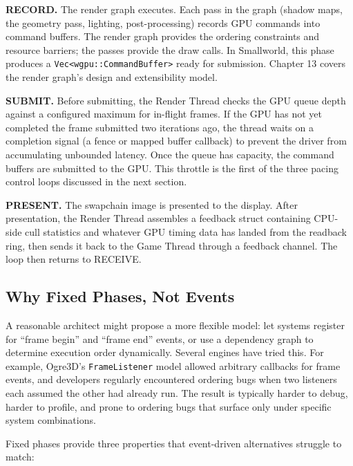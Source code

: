 \documentclass[
  11pt,
  letterpaper,
  DIV=11,
  numbers=noendperiod,
  twoside,
  open=right]{scrreprt}
\begin{document}
\textbf{RECORD.} The render graph executes. Each pass in the graph
(shadow maps, the geometry pass, lighting, post-processing) records GPU
commands into command buffers. The render graph provides the ordering
constraints and resource barriers; the passes provide the draw calls. In
Smallworld, this phase produces a
\texttt{Vec\textless{}wgpu::CommandBuffer\textgreater{}} ready for
submission. Chapter 13 covers the render graph's design and
extensibility model.

\textbf{SUBMIT.} Before submitting, the Render Thread checks the GPU
queue depth against a configured maximum for in-flight frames. If the
GPU has not yet completed the frame submitted two iterations ago, the
thread waits on a completion signal (a fence or mapped buffer callback)
to prevent the driver from accumulating unbounded latency. Once the
queue has capacity, the command buffers are submitted to the GPU. This
throttle is the first of the three pacing control loops discussed in the
next section.

\textbf{PRESENT.} The swapchain image is presented to the display. After
presentation, the Render Thread assembles a feedback struct containing
CPU-side cull statistics and whatever GPU timing data has landed from
the readback ring, then sends it back to the Game Thread through a
feedback channel. The loop then returns to RECEIVE.

\subsection{Why Fixed Phases, Not
Events}\label{why-fixed-phases-not-events}

A reasonable architect might propose a more flexible model: let systems
register for ``frame begin'' and ``frame end'' events, or use a
dependency graph to determine execution order dynamically. Several
engines have tried this. For example, Ogre3D's \texttt{FrameListener}
model allowed arbitrary callbacks for frame events, and developers
regularly encountered ordering bugs when two listeners each assumed the
other had already run. The result is typically harder to debug, harder
to profile, and prone to ordering bugs that surface only under specific
system combinations.

Fixed phases provide three properties that event-driven alternatives
struggle to match:
\end{document}
